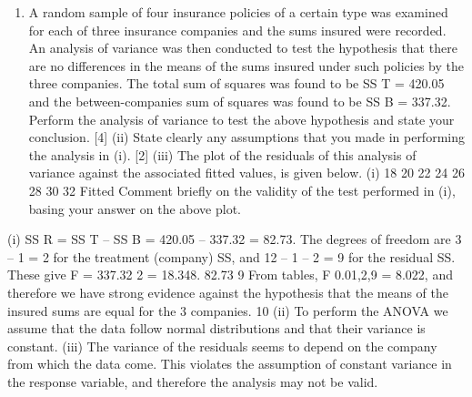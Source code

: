 \documentclass[a4paper,12pt]{article}
\begin{document}
\begin{enumerate}%
\item A random sample of four insurance policies of a certain type was examined for each of three insurance companies and the sums insured were recorded. An analysis of variance was then conducted to test the hypothesis that there are no differences in the
means of the sums insured under such policies by the three companies.
The total sum of squares was found to be SS T = 420.05 and the between-companies
sum of squares was found to be SS B = 337.32.
Perform the analysis of variance to test the above hypothesis and state your
conclusion.
[4]
(ii) State clearly any assumptions that you made in performing the analysis in (i).
[2]
(iii) The plot of the residuals of this analysis of variance against the associated
fitted values, is given below.
(i)
18
20
22
24
26
28
30
32
Fitted
Comment briefly on the validity of the test performed in (i), basing your
answer on the above plot.
\end{enumerate}
(i)
SS R = SS T – SS B = 420.05 – 337.32 = 82.73.
The degrees of freedom are 3 – 1 = 2 for the treatment (company) SS, and
12 – 1 – 2 = 9 for the residual SS.
These give F =
337.32 2
= 18.348.
82.73 9
From tables, F 0.01,2,9 = 8.022, and therefore we have strong evidence against the hypothesis that the means of the insured sums are equal for the 3
companies.
10
(ii) To perform the ANOVA we assume that the data follow normal distributions and that their variance is constant.
(iii) The variance of the residuals seems to depend on the company from which the data come. This violates the assumption of constant variance in the response variable, and therefore the analysis may not be valid.
\end{document}
